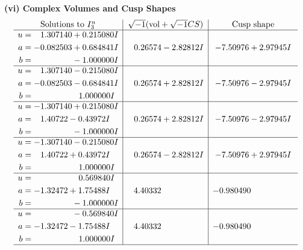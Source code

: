 \documentclass[1p]{elsarticle_modified}
\theoremstyle{definition}
\newcommand{\I}{\sqrt{-1}}
\begin{document}
\newpage\flushleft \textbf{(vi) Complex Volumes and Cusp Shapes}
$$\begin{array}{c|c|c}  
\text{Solutions to }I^u_{3}& \I (\text{vol} + \sqrt{-1}CS) & \text{Cusp shape}\\
 \hline 
\begin{aligned}
u &= \phantom{-}1.307140 + 0.215080 I \\
a &= -0.082503 + 0.684841 I \\
b &= \phantom{-0.000000 } -1.000000 I\end{aligned}
 & \phantom{-}0.26574 - 2.82812 I & -7.50976 + 2.97945 I \\ \hline\begin{aligned}
u &= \phantom{-}1.307140 - 0.215080 I \\
a &= -0.082503 - 0.684841 I \\
b &= \phantom{-0.000000 -}1.000000 I\end{aligned}
 & \phantom{-}0.26574 + 2.82812 I & -7.50976 - 2.97945 I \\ \hline\begin{aligned}
u &= -1.307140 + 0.215080 I \\
a &= \phantom{-}1.40722 - 0.43972 I \\
b &= \phantom{-0.000000 } -1.000000 I\end{aligned}
 & \phantom{-}0.26574 + 2.82812 I & -7.50976 - 2.97945 I \\ \hline\begin{aligned}
u &= -1.307140 - 0.215080 I \\
a &= \phantom{-}1.40722 + 0.43972 I \\
b &= \phantom{-0.000000 -}1.000000 I\end{aligned}
 & \phantom{-}0.26574 - 2.82812 I & -7.50976 + 2.97945 I \\ \hline\begin{aligned}
u &= \phantom{-0.000000 -}0.569840 I \\
a &= -1.32472 + 1.75488 I \\
b &= \phantom{-0.000000 } -1.000000 I\end{aligned}
 & \phantom{-}4.40332\phantom{ +0.000000I} & -0.980490\phantom{ +0.000000I} \\ \hline\begin{aligned}
u &= \phantom{-0.000000 } -0.569840 I \\
a &= -1.32472 - 1.75488 I \\
b &= \phantom{-0.000000 -}1.000000 I\end{aligned}
 & \phantom{-}4.40332\phantom{ +0.000000I} & -0.980490\phantom{ +0.000000I}\\
 \hline 
 \end{array}$$\newpage
\end{document}
